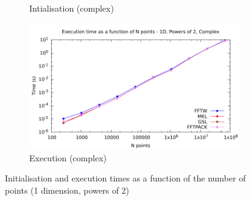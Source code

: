 \documentclass[12pt, a4paper]{article}
\begin{document}
\begin{figure}[H]
\begin{subfigure}{.5\textwidth}
\caption{Intialisation (complex)}
\label{1DPOW2CI}
\end{subfigure}%
\begin{subfigure}{.5\textwidth}
\centering
\includegraphics[width=.9\linewidth]{graphs/1d-pow2-exec-c.pdf}
\caption{Execution (complex)}
\label{1DPOW2C}
\end{subfigure}
\caption{Initialisation and execution times as a function of the number of points (1 dimension, powers of 2)}
\label{1DPOW2}
\end{figure}
\end{document}

